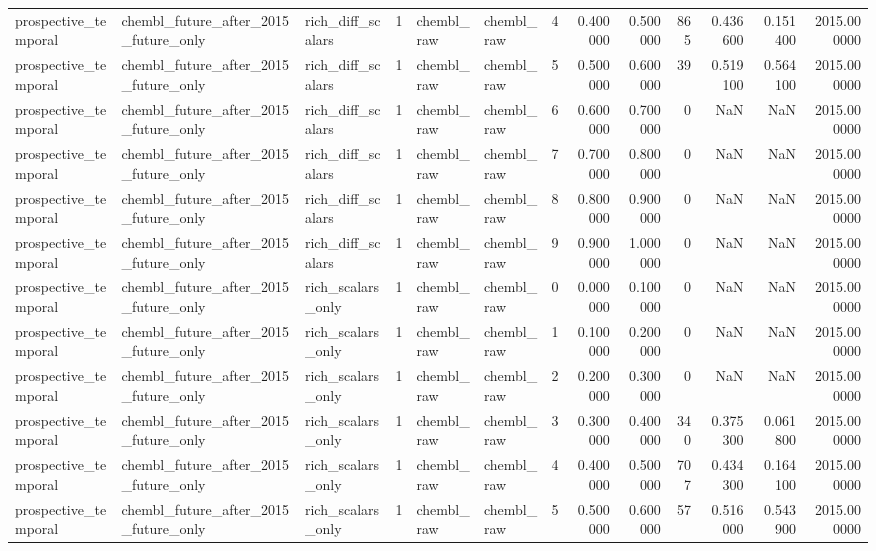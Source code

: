 \begin{longtable}{lllrllrrrrrrr}
prospective\_temporal & chembl\_future\_after\_2015\_future\_only & rich\_diff\_scalars & 1 & chembl\_raw & chembl\_raw & 4 & 0.400000 & 0.500000 & 865 & 0.436600 & 0.151400 & 2015.000000 \\
prospective\_temporal & chembl\_future\_after\_2015\_future\_only & rich\_diff\_scalars & 1 & chembl\_raw & chembl\_raw & 5 & 0.500000 & 0.600000 & 39 & 0.519100 & 0.564100 & 2015.000000 \\
prospective\_temporal & chembl\_future\_after\_2015\_future\_only & rich\_diff\_scalars & 1 & chembl\_raw & chembl\_raw & 6 & 0.600000 & 0.700000 & 0 & NaN & NaN & 2015.000000 \\
prospective\_temporal & chembl\_future\_after\_2015\_future\_only & rich\_diff\_scalars & 1 & chembl\_raw & chembl\_raw & 7 & 0.700000 & 0.800000 & 0 & NaN & NaN & 2015.000000 \\
prospective\_temporal & chembl\_future\_after\_2015\_future\_only & rich\_diff\_scalars & 1 & chembl\_raw & chembl\_raw & 8 & 0.800000 & 0.900000 & 0 & NaN & NaN & 2015.000000 \\
prospective\_temporal & chembl\_future\_after\_2015\_future\_only & rich\_diff\_scalars & 1 & chembl\_raw & chembl\_raw & 9 & 0.900000 & 1.000000 & 0 & NaN & NaN & 2015.000000 \\
prospective\_temporal & chembl\_future\_after\_2015\_future\_only & rich\_scalars\_only & 1 & chembl\_raw & chembl\_raw & 0 & 0.000000 & 0.100000 & 0 & NaN & NaN & 2015.000000 \\
prospective\_temporal & chembl\_future\_after\_2015\_future\_only & rich\_scalars\_only & 1 & chembl\_raw & chembl\_raw & 1 & 0.100000 & 0.200000 & 0 & NaN & NaN & 2015.000000 \\
prospective\_temporal & chembl\_future\_after\_2015\_future\_only & rich\_scalars\_only & 1 & chembl\_raw & chembl\_raw & 2 & 0.200000 & 0.300000 & 0 & NaN & NaN & 2015.000000 \\
prospective\_temporal & chembl\_future\_after\_2015\_future\_only & rich\_scalars\_only & 1 & chembl\_raw & chembl\_raw & 3 & 0.300000 & 0.400000 & 340 & 0.375300 & 0.061800 & 2015.000000 \\
prospective\_temporal & chembl\_future\_after\_2015\_future\_only & rich\_scalars\_only & 1 & chembl\_raw & chembl\_raw & 4 & 0.400000 & 0.500000 & 707 & 0.434300 & 0.164100 & 2015.000000 \\
prospective\_temporal & chembl\_future\_after\_2015\_future\_only & rich\_scalars\_only & 1 & chembl\_raw & chembl\_raw & 5 & 0.500000 & 0.600000 & 57 & 0.516000 & 0.543900 & 2015.000000 \\

\end{longtable}
